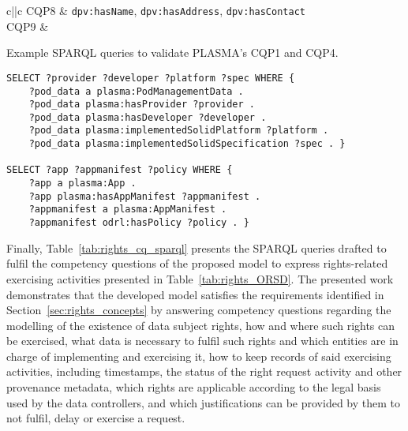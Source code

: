 \begin{table}[htp]
\begin{tabular}{c||c}
        \hline
        CQP8 & \texttt{dpv:hasName}, \texttt{dpv:hasAddress}, \texttt{dpv:hasContact} \\
        \hline
        CQP9 &  \\
    \end{tabular}
\end{table}

\begin{listing}[htp]
\caption{Example SPARQL queries to validate PLASMA's CQP1 and CQP4.}
\label{list:plasma_sparql_cq}
\begin{verbatim}
SELECT ?provider ?developer ?platform ?spec WHERE {
    ?pod_data a plasma:PodManagementData . 
    ?pod_data plasma:hasProvider ?provider . 
    ?pod_data plasma:hasDeveloper ?developer .
    ?pod_data plasma:implementedSolidPlatform ?platform .
    ?pod_data plasma:implementedSolidSpecification ?spec . }

SELECT ?app ?appmanifest ?policy WHERE {
    ?app a plasma:App . 
    ?app plasma:hasAppManifest ?appmanifest . 
    ?appmanifest a plasma:AppManifest .
    ?appmanifest odrl:hasPolicy ?policy . }
\end{verbatim}
\end{listing}

Finally, Table~\ref{tab:rights_cq_sparql} presents the SPARQL queries drafted to fulfil the competency questions of the proposed model to express rights-related exercising activities presented in Table~\ref{tab:rights_ORSD}.
The presented work demonstrates that the developed model satisfies the requirements identified in Section~\ref{sec:rights_concepts} by answering competency questions regarding the modelling of the existence of data subject rights, how and where such rights can be exercised, what data is necessary to fulfil such rights and which entities are in charge of implementing and exercising it, how to keep records of said exercising activities, including timestamps, the status of the right request activity and other provenance metadata, which rights are applicable according to the legal basis used by the data controllers, and which justifications can be provided by them to not fulfil, delay or exercise a request.

